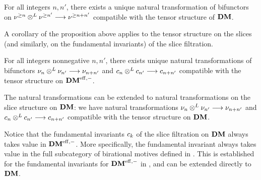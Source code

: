 \begin{cor}\label{cor_tDM_sfilt_DM}
For all integers $n, n'$, there exists a unique natural 
transformation of bifunctors on $\nu^{\geq n} \otimes^L \nu^{\geq n'} \longrightarrow 
\nu^{\geq n + n'}$ compatible with the tensor structure of $\mathbf{DM}$.
\end{cor}

A corollary of the proposition above applies to the tensor
structure on the slices (and similarly, on the fundamental 
invariants) of the slice filtration.

\begin{cor}
For all integers nonnegative $n, n'$, there exists unique
natural transformations of bifunctors $\nu_{n} \otimes^L 
\nu_{n'} \longrightarrow \nu_{n + n'}$ and $c_{n} \otimes^L
c_{n'} \longrightarrow c_{n + n'}$ compatible with the tensor structure
on $\mathbf{DM}^{\mathrm{eff},-}$.

The natural transformations can be extended to natural 
transformations on the slice structure on $\mathbf{DM}$: we have natural 
transformations $\nu_{n} \otimes^L \nu_{n'} \longrightarrow 
\nu_{n + n'}$ and $c_{n} \otimes^L c_{n'} \longrightarrow c_{n + n'}$
compatible with the tensor structure on $\mathbf{DM}$.
\end{cor}

\begin{rmk}
Notice that the fundamental invariants $c_{k}$ of the slice 
filtration on $\mathbf{DM}$ always takes value in $\mathbf{DM}^{\mathrm{eff},-}$. More 
specifically, the fundamental invariant always takes value in the 
full subcategory of birational motives defined in \cite{KaSu}. 
This is established for the fundamental invariants for $\mathbf{DM}^{\mathrm{eff},-}$ 
in \cite[Section 2]{HuKa}, and can be extended directly to $\mathbf{DM}$.
\end{rmk}

